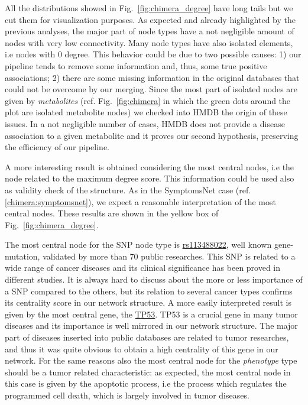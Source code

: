 \documentclass{standalone}
\begin{document}
All the distributions showed in Fig.~\ref{fig:chimera_degree} have long tails but we cut them for visualization purposes.
As expected and already highlighted by the previous analyses, the major part of node types have a not negligible amount of nodes with very low connectivity.
Many node types have also isolated elements, i.e nodes with $0$ degree.
This behavior could be due to two possible causes: 1) our pipeline tends to remove some information and, thus, some true positive associations; 2) there are some missing information in the original databases that could not be overcome by our merging.
Since the most part of isolated nodes are given by \emph{metabolites} (ref. Fig.~\ref{fig:chimera} in which the green dots around the plot are isolated metabolite nodes) we checked into HMDB the origin of these issues.
In a not negligible number of cases, HMDB does not provide a disease association to a given metabolite and it proves our second hypothesis, preserving the efficiency of our pipeline.

A more interesting result is obtained considering the most central nodes, i.e the node related to the maximum degree score.
This information could be used also as validity check of the structure.
As in the \textsf{SymptomsNet} case (ref. \ref{chimera:symptomsnet}), we expect a reasonable interpretation of the most central nodes.
These results are shown in the yellow box of Fig.~\ref{fig:chimera_degree}.

The most central node for the SNP node type is \href{https://www.ncbi.nlm.nih.gov/snp/rs113488022}{\textsf{rs113488022}}, well known gene-mutation, validated by more than 70 public researches.
This SNP is related to a wide range of cancer diseases and its clinical significance has been proved in different studies.
It is always hard to discuss about the more or less importance of a SNP compared to the others, but its relation to several cancer types confirms its centrality score in our network structure.
A more easily interpreted result is given by the most central gene, the \href{https://ghr.nlm.nih.gov/gene/TP53}{\textsf{TP53}}.
\textsf{TP53} is a crucial gene in many tumor diseases and its importance is well mirrored in our network structure.
The major part of diseases inserted into public databases are related to tumor researches, and thus it was quite obvious to obtain a high centrality of this gene in our network.
For the same reasons also the most central node for the \emph{phenotype} type should be a tumor related characteristic: as expected, the most central node in this case is given by the \textsf{apoptotic process}, i.e the process which regulates the programmed cell death, which is largely involved in tumor diseases.
\end{document}
